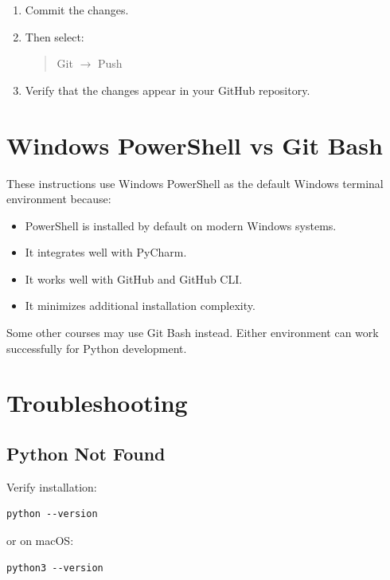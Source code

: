 \documentclass[11pt]{article}
\begin{document}
\begin{enumerate}[resume]
    \item Commit the changes.

    \item Then select:
    \begin{quote}
    Git $\rightarrow$ Push
    \end{quote}

    \item Verify that the changes appear in your GitHub repository.
\end{enumerate}

\section{Windows PowerShell vs Git Bash}

These instructions use Windows PowerShell as the default Windows terminal environment because:

\begin{itemize}
    \item PowerShell is installed by default on modern Windows systems.
    \item It integrates well with PyCharm.
    \item It works well with GitHub and GitHub CLI.
    \item It minimizes additional installation complexity.
\end{itemize}

Some other courses may use Git Bash instead. Either environment can work successfully for Python development.

\section{Troubleshooting}

\subsection{Python Not Found}

Verify installation:

\begin{lstlisting}
python --version
\end{lstlisting}

or on macOS:

\begin{lstlisting}
python3 --version
\end{lstlisting}
\end{document}
